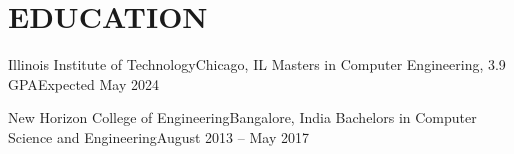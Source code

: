 \section{EDUCATION}\vspace*{-4pt}

    \resumeSubHeadingListStart

        \resumeSubheading
        {Illinois Institute of Technology}{Chicago, IL}
        {Masters in Computer Engineering}{, 3.9 GPA}{Expected May 2024}
        \resumeItemListStart
        \resumeItemListEnd

        \resumeSubheading
        {New Horizon College of Engineering}{Bangalore, India}
        {Bachelors in Computer Science and Engineering}{}{August 2013 -- May 2017}
        \resumeItemListStart
        \resumeItemListEnd

    \resumeSubHeadingListEnd